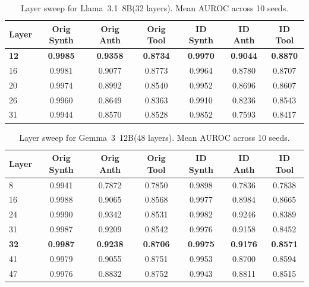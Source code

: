 \documentclass{article}
\newcommand{\auroc}{AUROC\xspace}
\newcommand{\llama}{Llama~3.1~8B\xspace}
\newcommand{\gemma}{Gemma~3~12B\xspace}
\begin{document}
\begin{table}[h]
\centering
\caption{Layer sweep for \llama (32 layers). Mean \auroc across 10 seeds.}
\label{tab:llama_sweep}
\begin{tabular}{lcccccc}
\toprule
Layer & Orig Synth & Orig Anth & Orig Tool & ID Synth & ID Anth & ID Tool \\
\midrule
\textbf{12} & \textbf{0.9985} & \textbf{0.9358} & \textbf{0.8734} & \textbf{0.9970} & \textbf{0.9044} & \textbf{0.8870} \\
16          & 0.9981          & 0.9077          & 0.8773          & 0.9964          & 0.8780          & 0.8707          \\
20          & 0.9974          & 0.8992          & 0.8540          & 0.9952          & 0.8696          & 0.8607          \\
26          & 0.9960          & 0.8649          & 0.8363          & 0.9910          & 0.8236          & 0.8543          \\
31          & 0.9944          & 0.8570          & 0.8528          & 0.9852          & 0.7593          & 0.8417          \\
\bottomrule
\end{tabular}
\end{table}

\begin{table}[h]
\centering
\caption{Layer sweep for \gemma (48 layers). Mean \auroc across 10 seeds.}
\label{tab:gemma_sweep}
\begin{tabular}{lcccccc}
\toprule
Layer & Orig Synth & Orig Anth & Orig Tool & ID Synth & ID Anth & ID Tool \\
\midrule
8           & 0.9941          & 0.7872          & 0.7850          & 0.9898          & 0.7836          & 0.7838          \\
16          & 0.9988          & 0.9065          & 0.8568          & 0.9977          & 0.8984          & 0.8665          \\
24          & 0.9990          & 0.9342          & 0.8531          & 0.9982          & 0.9246          & 0.8389          \\
31          & 0.9987          & 0.9209          & 0.8542          & 0.9976          & 0.9158          & 0.8452          \\
\textbf{32} & \textbf{0.9987} & \textbf{0.9238} & \textbf{0.8706} & \textbf{0.9975} & \textbf{0.9176} & \textbf{0.8571} \\
41          & 0.9979          & 0.9055          & 0.8751          & 0.9953          & 0.8700          & 0.8594          \\
47          & 0.9976          & 0.8832          & 0.8752          & 0.9943          & 0.8811          & 0.8515          \\
\bottomrule
\end{tabular}
\end{table}
\end{document}
